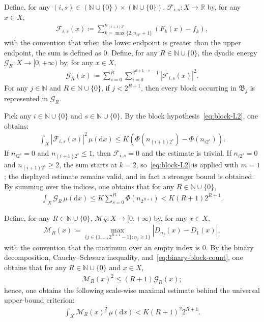 \documentclass[12pt,reqno]{amsart}
\theoremstyle{definition}
\theoremstyle{plain}
\begin{document}
Define, for any $(i,s)\in(\mathbb{N}\cup\{0\})\times(\mathbb{N}\cup\{0\})$, $\mathcal{F}_{i,s}:X\to\mathbb{R}$ by, for any $x\in X$,
\begin{align*}
    \mathcal{F}_{i,s}(x)
    \coloneqq
    \sum_{k=\max\{2,n_{i2^s}+1\}}^{n_{(i+1)2^s}}
    (F_k(x)-f_k),
\end{align*}
with the convention that when the lower endpoint is greater than the upper endpoint, the sum is defined as 0. Define, for any $R\in\mathbb{N}\cup\{0\}$, the dyadic energy $\mathcal{G}_R:X\to[0,+\infty)$ by, for any $x\in X$,
\begin{align*}
    \mathcal{G}_R(x)
    \coloneqq
    \sum_{s=0}^R
    \sum_{i=0}^{2^{R+1-s}-1}
    |\mathcal{F}_{i,s}(x)|^2.
\end{align*}
For any $j\in\mathbb{N}$ and $R\in\mathbb{N}\cup\{0\}$, if $j<2^{R+1}$, then every block occurring in $\mathfrak B_j$ is represented in $\mathcal{G}_R$.

Pick any $i\in\mathbb{N}\cup\{0\}$ and $s\in\mathbb{N}\cup\{0\}$. By the block hypothesis~\eqref{eq:block-L2}, one obtains:
\begin{align*}
    \int_X\left|\mathcal{F}_{i,s}(x)\right|^2\,\mu(\mathrm dx)
    \leq K\left(\Phi\left(n_{(i+1)2^s}\right)-\Phi\left(n_{i2^s}\right)\right).
\end{align*}
If $n_{i2^s}=0$ and $n_{(i+1)2^s}\leq1$, then $\mathcal{F}_{i,s}=0$ and the estimate is trivial. If $n_{i2^s}=0$ and $n_{(i+1)2^s}\geq2$, the sum starts at $k=2$, so~\eqref{eq:block-L2} is applied with $m=1$; the displayed estimate remains valid, and in fact a stronger bound is obtained. By summing over the indices, one obtains that for any $R\in\mathbb{N}\cup\{0\}$, 
\begin{align}
\label{eq:energy-bound}
    \int_X\mathcal{G}_R\,\mu(\mathrm dx)
    \leq K\sum_{s=0}^R\Phi(n_{2^{R+1}})
    < K(R+1)2^{R+1}.
\end{align}

Define, for any $R\in\mathbb{N}\cup\{0\}$, $\mathcal{M}_R:X\to[0,+\infty)$ by, for any $x\in X$,
\begin{align*}
    \mathcal{M}_R(x)
    \coloneqq
    \max_{\{j\in\{1,\ldots,2^{R+1}-1\}:n_j\geq1\}}\left|D_{n_j}(x)-D_1(x)\right|,
\end{align*}
with the convention that the maximum over an empty index is $0$. By the binary decomposition, Cauchy--Schwarz inequality, and~\eqref{eq:binary-block-count}, one obtains that for any $R\in\mathbb{N}\cup\{0\}$ and $x\in X$,
\begin{align*}
    \mathcal{M}_R(x)^2
    \leq (R+1)\mathcal{G}_R(x);
\end{align*}
hence, one obtains the following scale-wise maximal estimate behind the universal upper-bound criterion:
\begin{align}
\label{eq:maximal-L2}
    \int_X\mathcal{M}_R(x)^2\,\mu(\mathrm dx)
    < K(R+1)^2 2^{R+1}.
\end{align}
\end{document}
